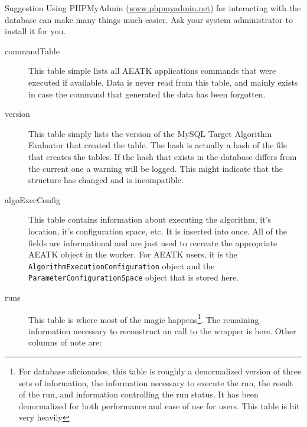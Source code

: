 \documentclass[11pt,letterpaper,oneside]{article}
\begin{document}
\begin{bclogo}[logo=\bclampe, couleurBarre=red, noborder=true]{Suggestion}
Using PHPMyAdmin (\url{www.phpmyadmin.net}) for interacting with the database can make many things much easier. Ask your system administrator to install it for you.

\end{bclogo}

\begin{description}

\item[commandTable]	 This table simple lists all AEATK applications commands that were executed if available. Data is never read from this table, and mainly exists in case the command that generated the data has been forgotten.

\item[version] This table simply lists the version of the MySQL Target Algorithm Evaluator that created the table. The hash is actually a hash of the file that creates the tables. If the hash that exists in the database differs from the current one a warning will be logged. This might indicate that the structure has changed and is incompatible.

\item[algoExecConfig] This table contains information about executing the algorithm, it's location, it's configuration space, etc. It is inserted into once. All of the fields are informational and are just used to recreate the appropriate AEATK object in the worker. For AEATK users, it is the \texttt{AlgorithmExecutionConfiguration} object and the \texttt{ParameterConfigurationSpace} object that is stored here.

\item[runs] This table is where most of the magic happens\footnote{For database aficionados, this table is roughly a denormalized version of three sets of information, the information necessary to execute the run, the result of the run, and information controlling the run status. It has been denormalized for both performance and ease of use for users. This table is hit very heavily}. The remaining information necessary to reconstruct an call to the wrapper is here.  Other columns of note are:


\end{description}
\end{document}
